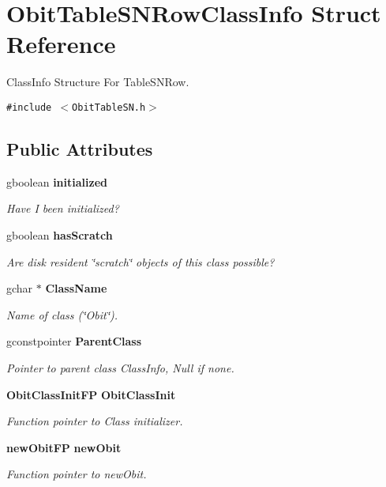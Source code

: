 \section{Obit\-Table\-SNRow\-Class\-Info Struct Reference}
\label{structObitTableSNRowClassInfo}
Class\-Info Structure For Table\-SNRow.  


{\tt \#include $<$Obit\-Table\-SN.h$>$}

\subsection*{Public Attributes}
\begin{CompactItemize}
\item 
gboolean {\bf initialized}
\begin{CompactList}\small\item\em Have I been initialized? \item\end{CompactList}\item 
gboolean {\bf has\-Scratch}
\begin{CompactList}\small\item\em Are disk resident \char`\"{}scratch\char`\"{} objects of this class possible? \item\end{CompactList}\item 
gchar $\ast$ {\bf Class\-Name}
\begin{CompactList}\small\item\em Name of class (\char`\"{}Obit\char`\"{}). \item\end{CompactList}\item 
gconstpointer {\bf Parent\-Class}
\begin{CompactList}\small\item\em Pointer to parent class Class\-Info, Null if none. \item\end{CompactList}\item 
{\bf Obit\-Class\-Init\-FP} {\bf Obit\-Class\-Init}
\begin{CompactList}\small\item\em Function pointer to Class initializer. \item\end{CompactList}\item 
{\bf new\-Obit\-FP} {\bf new\-Obit}
\begin{CompactList}\small\item\em Function pointer to new\-Obit. \item\end{CompactList}\item 

\end{CompactItemize}
